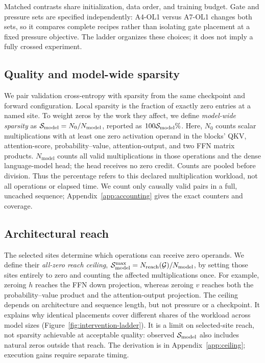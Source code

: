 Matched contrasts share initialization, data order, and training budget.
Gate and pressure sets are specified independently: A4-OL1 versus A7-OL1
changes both sets, so it compares complete recipes rather than isolating gate
placement at a fixed pressure objective. The ladder organizes these choices;
it does not imply a fully crossed experiment.

\subsection{Quality and model-wide sparsity}
\label{sec:measurement}

We pair validation cross-entropy with sparsity from the same checkpoint and
forward configuration. Local sparsity is the fraction of exactly zero entries
at a named site. To weight zeros by the work they affect, we define
\emph{model-wide sparsity} as $\mathcal{S}_{\mathrm{model}}=N_0/N_{\mathrm{model}}$, reported as
$100\mathcal{S}_{\mathrm{model}}\%$. Here, $N_0$ counts scalar multiplications with at least one
zero activation operand in the blocks' QKV, attention-score, probability--value,
attention-output, and two FFN matrix products. $N_{\mathrm{model}}$ counts all
valid multiplications in those operations and the dense language-model head;
the head receives no zero credit. Counts are pooled before division. Thus the
percentage refers to this declared multiplication workload, not all operations
or elapsed time. We count only causally valid pairs in a full, uncached
sequence; Appendix~\ref{app:accounting} gives the exact counters and coverage.

\subsection{Architectural reach}
\label{sec:reach}

The selected sites determine which operations can receive zero operands.
We define their \emph{all-zero reach ceiling},
$\mathcal{S}_{\mathrm{model}}^{\max}=N_{\mathrm{reach}}(\mathcal{G})/N_{\mathrm{model}}$, by setting those
sites entirely to zero and counting the affected multiplications once.
For example, zeroing $h$ reaches the FFN down projection, whereas zeroing $v$
reaches both the probability--value product and the attention-output projection.
The ceiling depends on architecture and sequence length, but not pressure or
a checkpoint. It explains why identical placements cover different shares of
the workload across model sizes (Figure~\ref{fig:intervention-ladder}).
It is a limit on selected-site reach, not sparsity achievable at acceptable
quality: observed $\mathcal{S}_{\mathrm{model}}$ also includes natural zeros outside that reach.
The derivation is in Appendix~\ref{app:ceiling}; execution gains require
separate timing.
